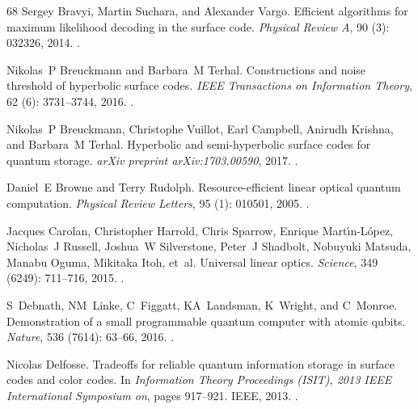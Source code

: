 \documentclass[a4paper, 10pt, accepted=2021-11-03]{quantumarticle}
\begin{document}
{\begin{thebibliography}{68}
Sergey Bravyi, Martin Suchara, and Alexander Vargo.
\newblock Efficient algorithms for maximum likelihood decoding in the surface
  code.
\newblock \emph{Physical Review A}, 90 (3): 032326, 2014.
\newblock {}.

Nikolas~P Breuckmann and Barbara~M Terhal.
\newblock Constructions and noise threshold of hyperbolic surface codes.
\newblock \emph{IEEE Transactions on Information Theory}, 62
  (6): 3731--3744, 2016.
\newblock {}.

Nikolas~P Breuckmann, Christophe Vuillot, Earl Campbell, Anirudh Krishna, and
  Barbara~M Terhal.
\newblock Hyperbolic and semi-hyperbolic surface codes for quantum storage.
\newblock \emph{arXiv preprint arXiv:1703.00590}, 2017.
\newblock {}.

Daniel~E Browne and Terry Rudolph.
\newblock Resource-efficient linear optical quantum computation.
\newblock \emph{Physical Review Letters}, 95 (1): 010501,
  2005.
\newblock {}.

Jacques Carolan, Christopher Harrold, Chris Sparrow, Enrique
  Mart{\'\i}n-L{\'o}pez, Nicholas~J Russell, Joshua~W Silverstone, Peter~J
  Shadbolt, Nobuyuki Matsuda, Manabu Oguma, Mikitaka Itoh, et~al.
\newblock Universal linear optics.
\newblock \emph{Science}, 349 (6249): 711--716, 2015.
\newblock {}.

S~Debnath, NM~Linke, C~Figgatt, KA~Landsman, K~Wright, and C~Monroe.
\newblock Demonstration of a small programmable quantum computer with atomic
  qubits.
\newblock \emph{Nature}, 536 (7614): 63--66, 2016.
\newblock {}.

Nicolas Delfosse.
\newblock Tradeoffs for reliable quantum information storage in surface codes
  and color codes.
\newblock In \emph{Information Theory Proceedings (ISIT), 2013 IEEE
  International Symposium on}, pages 917--921. IEEE, 2013.
\newblock {}.


\end{thebibliography}}
\end{document}
